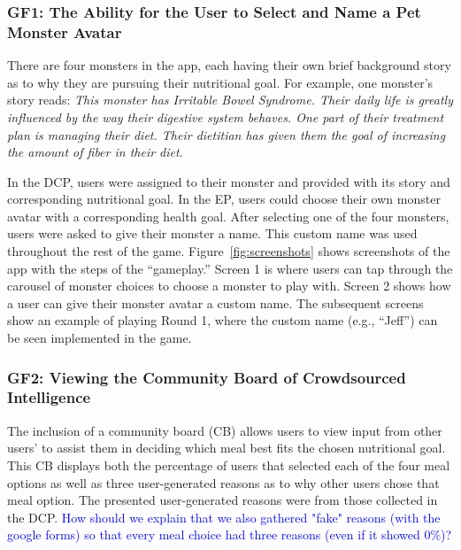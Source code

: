 \subsubsection{GF1: The Ability for the User to Select and Name a Pet Monster Avatar}

There are four monsters in the app, each having their own brief background story as to why they are pursuing their nutritional goal. 
For example, one monster's story reads: \textit{This monster has Irritable Bowel Syndrome. Their daily life is greatly influenced by the way their digestive system behaves. One part of their treatment plan is managing their diet. Their dietitian has given them the goal of increasing the amount of fiber in their diet}. 

In the DCP, users were assigned to their monster and provided with its story and corresponding nutritional goal. 
In the EP, users could choose their own monster avatar with a corresponding health goal. After selecting one of the four monsters, users were asked to give their monster a name. 
This custom name was used throughout the rest of the game. 
Figure~\ref{fig:screenshots} shows screenshots of the app with the steps of the ``gameplay.'' 
Screen 1 is where users can tap through the carousel of monster choices to choose a monster to play with. Screen 2 shows how a user can give their monster avatar a custom name. The subsequent screens show an example of playing Round 1, where the custom name (e.g., ``Jeff'') can be seen implemented in the game.

\subsubsection{GF2: Viewing the Community Board of Crowdsourced Intelligence}

The inclusion of a community board (CB) allows users to view input from other users' to assist them in deciding which meal best fits the chosen nutritional goal. 
This CB displays both the percentage of users that selected each of the four meal options as well as three user-generated reasons as to why other users chose that meal option. The presented user-generated reasons were from those collected in the DCP. 
\textcolor{blue}{How should we explain that we also gathered "fake" reasons (with the google forms) so that every meal choice had three reasons (even if it showed 0\%)?}


  
